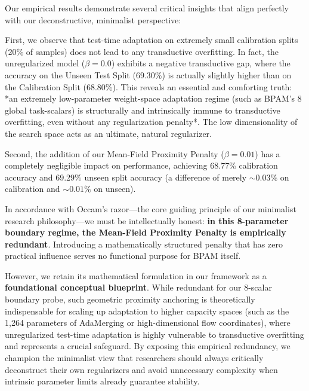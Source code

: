 Our empirical results demonstrate several critical insights that align perfectly with our deconstructive, minimalist perspective:

First, we observe that test-time adaptation on extremely small calibration splits (20\% of samples) does not lead to any transductive overfitting. In fact, the unregularized model ($\beta = 0.0$) exhibits a negative transductive gap, where the accuracy on the Unseen Test Split (69.30\%) is actually slightly higher than on the Calibration Split (68.80\%). This reveals an essential and comforting truth: *an extremely low-parameter weight-space adaptation regime (such as BPAM's 8 global task-scalars) is structurally and intrinsically immune to transductive overfitting, even without any regularization penalty*. The low dimensionality of the search space acts as an ultimate, natural regularizer.

Second, the addition of our Mean-Field Proximity Penalty ($\beta = 0.01$) has a completely negligible impact on performance, achieving 68.77\% calibration accuracy and 69.29\% unseen split accuracy (a difference of merely $\sim 0.03\%$ on calibration and $\sim 0.01\%$ on unseen). 

In accordance with Occam's razor—the core guiding principle of our minimalist research philosophy—we must be intellectually honest: {\bf in this 8-parameter boundary regime, the Mean-Field Proximity Penalty is empirically redundant}. Introducing a mathematically structured penalty that has zero practical influence serves no functional purpose for BPAM itself. 

However, we retain its mathematical formulation in our framework as a {\bf foundational conceptual blueprint}. While redundant for our 8-scalar boundary probe, such geometric proximity anchoring is theoretically indispensable for scaling up adaptation to higher capacity spaces (such as the 1,264 parameters of AdaMerging or high-dimensional flow coordinates), where unregularized test-time adaptation is highly vulnerable to transductive overfitting and represents a crucial safeguard. By exposing this empirical redundancy, we champion the minimalist view that researchers should always critically deconstruct their own regularizers and avoid unnecessary complexity when intrinsic parameter limits already guarantee stability.

